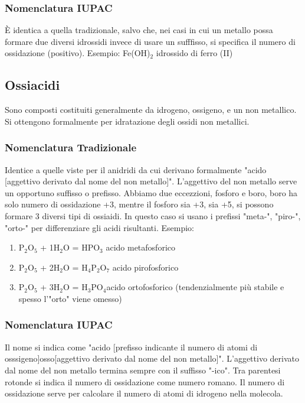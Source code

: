 \documentclass[a4paper]{article}
\begin{document}
\subsubsection{Nomenclatura IUPAC}
È identica a quella tradizionale, salvo che, nei casi in cui un metallo possa formare due diversi idrossidi invece di usare un sufffisso, si specifica il numero di ossidazione (positivo). 
Esempio: Fe(OH)$_2$ idrossido di ferro (II)

\subsection{Ossiacidi}
Sono composti costituiti generalmente da idrogeno, ossigeno, e un non metallico. Si ottengono formalmente per idratazione degli ossidi non metallici. 

\subsubsection{Nomenclatura Tradizionale}
Identice a quelle viste per il anidridi da cui derivano formalmente "acido [aggettivo derivato dal nome del non metallo]". L'aggettivo del non metallo serve un opportuno suffisso o prefisso. Abbiamo due eccezzioni, fosforo e boro, boro ha solo numero di ossidazione +3, mentre il fosforo sia +3, sia +5, si possono formare 3 diversi tipi di ossiaidi. In questo caso si usano i prefissi "meta-", "piro-", "orto-" per differenziare gli acidi risultanti. 
Esempio: 
\begin{enumerate}
    \item P$_2$O$_5$ + 1H$_2$O = HPO$_3$ acido metafosforico
    \item P$_2$O$_5$ + 2H$_2$O = H$_4$P$_2$O$_7$ acido pirofosforico
    \item P$_2$O$_5$ + 3H$_2$O = H$_3$PO$_4$acido ortofosforico (tendenzialmente più stabile e spesso l'"orto" viene omesso)
\end{enumerate}
\subsubsection{Nomenclatura IUPAC}
Il nome si indica come "acido [prefisso indicante il numero di atomi di osssigeno]osso[aggettivo derivato dal nome del non metallo]". L'aggettivo derivato dal nome del non metallo termina sempre con il suffisso "-ico". Tra parentesi rotonde si indica il numero di ossidazione come numero romano. Il numero di ossidazione serve per calcolare il numero di atomi di idrogeno nella molecola. 
\end{document}
